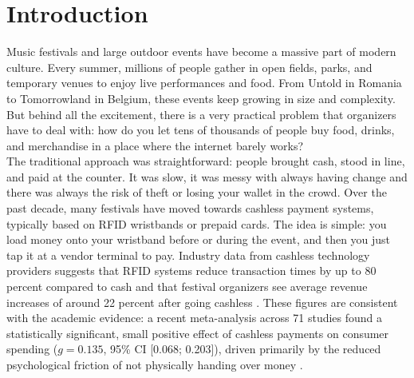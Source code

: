 \chapter{Introduction}
\label{chap:introduction}

Music festivals and large outdoor events have become a massive part of modern culture. Every summer, millions of people gather in open fields, parks, and temporary venues to enjoy live performances and food. From Untold in Romania to Tomorrowland in Belgium, these events keep growing in size and complexity. But behind all the excitement, there is a very practical problem that organizers have to deal with: how do you let tens of thousands of people buy food, drinks, and merchandise in a place where the internet barely works?\\

The traditional approach was straightforward: people brought cash, stood in line, and paid at the counter. It was slow, it was messy with always having change and there was always the risk of theft or losing your wallet in the crowd. Over the past decade, many festivals have moved towards cashless payment systems, typically based on RFID wristbands or prepaid cards. The idea is simple: you load money onto your wristband before or during the event, and then you just tap it at a vendor terminal to pay. Industry data from cashless technology providers suggests that RFID systems reduce transaction times by up to 80 percent compared to cash and that festival organizers see average revenue increases of around 22 percent after going cashless \cite{Tappit2024}. These figures are consistent with the academic evidence: a recent meta-analysis across 71 studies found a statistically significant, small positive effect of cashless payments on consumer spending ($g = 0.135$, 95\% CI [0.068; 0.203]), driven primarily by the reduced psychological friction of not physically handing over money \cite{Schomburgk2024}.

